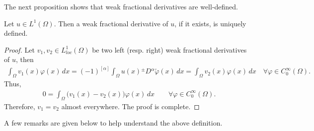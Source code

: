 \documentclass[leqno,final]{siamltex}
\numberwithin{equation}{section}
\renewcommand{\(}{\bigl(}
\renewcommand{\)}{\bigr)}
\begin{document}
The next proposition shows that weak fractional derivatives are well-defined. 

\begin{proposition}
	Let $u \in L^1 (\Omega)$. Then a weak fractional derivative of $u$, if it exists, is uniquely defined.
\end{proposition}

\begin{proof}
	Let $v_1, v_2 \in L^1_{loc} ( \Omega)$ be two left (resp. right) weak fractional derivatives of $u$, then
	\begin{align*}
	\int_{\Omega} v_1(x) \varphi(x) \, dx = (-1)^{[\alpha]} \int_{\Omega} u(x) {^{\pm}}{D}{^{\alpha}} 
	\tilde{\varphi}(x) \, dx 
	=   \int_{\Omega} v_2(x) \varphi(x) \, dx  \quad\forall \varphi \in C_{0}^{\infty} (\Omega).
	\end{align*}
	Thus, 
	\begin{align*}
	0 = \int_{\Omega} \big(v_1(x) - v_2(x) \big) \varphi(x) \, dx \qquad\forall \varphi \in C^{\infty}_{0} (\Omega).
	\end{align*}
	Therefore, $v_1 = v_2$ almost everywhere. The proof is complete.
\end{proof}

\smallskip
  A few remarks are given below to help understand the above definition. 
  
\end{document}
